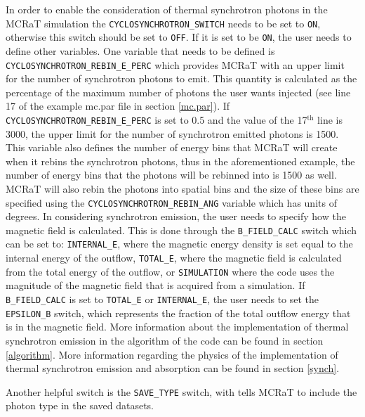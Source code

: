 \documentclass[12pt,a4paper]{article}
\begin{document}
In order to enable the consideration of thermal synchrotron photons in the MCRaT simulation the \texttt{CYCLOSYNCHROTRON\_SWITCH} needs to be set to \texttt{ON}, otherwise this switch should be set to \texttt{OFF}. If it is set to be \texttt{ON}, the user needs to define other variables. One variable that needs to be defined is \texttt{CYCLOSYNCHROTRON\_REBIN\_E\_PERC} which provides MCRaT with an upper limit for the number of synchrotron photons to emit. This quantity is calculated as the percentage of the maximum number of photons the user wants injected (see line 17 of the example mc.par file in section \ref{mc.par}). If \texttt{CYCLOSYNCHROTRON\_REBIN\_E\_PERC} is set to 0.5 and the value of the 17$^\textrm{th}$ line is 3000, the upper limit for the number of synchrotron emitted photons is 1500. This variable also defines the number of energy bins that MCRaT will create when it rebins the synchrotron photons, thus in the aforementioned example, the number of energy bins that the photons will be rebinned into is 1500 as well. MCRaT will also rebin the photons into spatial bins and the size of these bins are specified using the \texttt{CYCLOSYNCHROTRON\_REBIN\_ANG} variable which has units of degrees. In considering synchrotron emission, the user needs to specify how the magnetic field is calculated. This is done through the \texttt{B\_FIELD\_CALC} switch which can be set to: \texttt{INTERNAL\_E}, where the magnetic energy density is set equal to the internal energy of the outflow, \texttt{TOTAL\_E}, where the magnetic field is calculated from the total energy of the outflow, or \texttt{SIMULATION} where the code uses the magnitude of the magnetic field that is acquired from a simulation. If \texttt{B\_FIELD\_CALC} is set to \texttt{TOTAL\_E} or \texttt{INTERNAL\_E}, the user needs to set the \texttt{EPSILON\_B} switch, which represents the fraction of the total outflow energy that is in the magnetic field. More information about the implementation of thermal synchrotron emission in the algorithm of the code can be found in section \ref{algorithm}. More information regarding the physics of the implementation of thermal synchrotron emission and absorption can be found in section \ref{synch}. 

Another helpful switch is the \texttt{SAVE\_TYPE} switch, with tells MCRaT to include the photon type in the saved datasets. 
\end{document}
